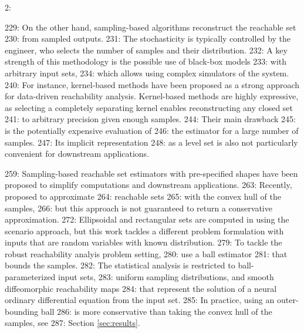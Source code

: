 2: \documentclass[12pt]{l4dc2022} %
\begin{document}
229: On the other hand, sampling-based algorithms reconstruct the reachable set %
230: from sampled outputs. %
231: The stochasticity is typically controlled by the engineer, who selects the number of samples and their distribution. 
232: A key strength of this methodology is the possible use of black-box models %
233: with arbitrary input sets, %
234: which allows using complex simulators of the system. 
240: For instance, kernel-based methods \citep{DeVito2014,Rudi2017,ThorpeL4DC2021} have been proposed as a strong approach for data-driven reachability analysis. Kernel-based methods are highly expressive, as selecting a completely separating kernel \citep{DeVito2014} enables reconstructing any closed set %
241: to arbitrary precision given enough samples. 
244: Their main drawback %
245: is the potentially expensive evaluation of %
246: the estimator for a large number of samples. %
247: Its implicit representation %
248: as a level set is also not particularly convenient for downstream applications. %

259: Sampling-based reachable set estimators with pre-specified shapes have been proposed to simplify computations and downstream applications. 
263: Recently, \citep{LewPavone2020} proposed to approximate %
264: reachable sets %
265: with the convex hull of the samples,  
266: but this approach is not guaranteed to return a conservative approximation. %
272: Ellipsoidal and rectangular sets are computed in \citep{DevonportL4DC2020} using the scenario approach, but this work tackles a different problem formulation with inputs that are random variables with known distribution.  
279: To tackle the robust reachability analyis problem setting, %
280: \citep{Gruenbacher2021} use a ball estimator %
281: that bounds the samples. %
282: The statistical analysis is restricted to ball-parameterized input sets, %
283: uniform sampling distributions, and smooth diffeomorphic reachability maps %
284: that represent the solution of a neural ordinary differential equation \citep{Chen2018} from the input set. %
285: In practice, using an outer-bounding ball %
286: is more conservative than taking the convex hull of the samples, see %
287: Section \ref{sec:results}. 
\end{document}
